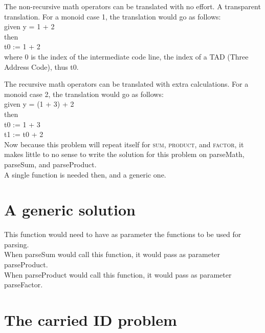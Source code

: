 \documentclass[twocolumn,10ptr]{article}
\begin{document}
	The non-recursive math operators can be translated with no effort. A transparent translation. For a monoid case 1, the translation would go as follows: \\
	
	given y \textsc{ = 1 + 2 } \\
	
	then  \\
	
	t0 \textsc{:= 1 + 2 } \\
	
	where 0 is the index of the intermediate code line, the index of a TAD (Three Address Code), thus t0.
	
	The recursive math operators can be translated with extra calculations. For a monoid case 2, the translation would go as follows: \\
	
	given y \textsc{ = (1 + 3) + 2 } \\
	
	then \\
	
	t0 \textsc{:= 1 + 3 } \\
	
	t1 \textsc{:=} t0 \textsc{+ 2 } \\
	
	Now because this problem will repeat itself for \textsc{ sum}, \textsc{product}, and \textsc{factor}, it makes little to no sense to write the solution for this problem on parseMath, parseSum, and parseProduct. \\ 
	A single function is needed then, and a generic one.
	
	
	
	
	
	
	\section{A generic solution}
	
	This function would need to have as parameter the functions to be used for parsing.\\
	When parseSum would call this function, it would pass as parameter parseProduct.\\	
	When parseProduct would call this function, it would pass as parameter parseFactor.
	
	
	
	\section{The carried ID problem}
	
\end{document}
